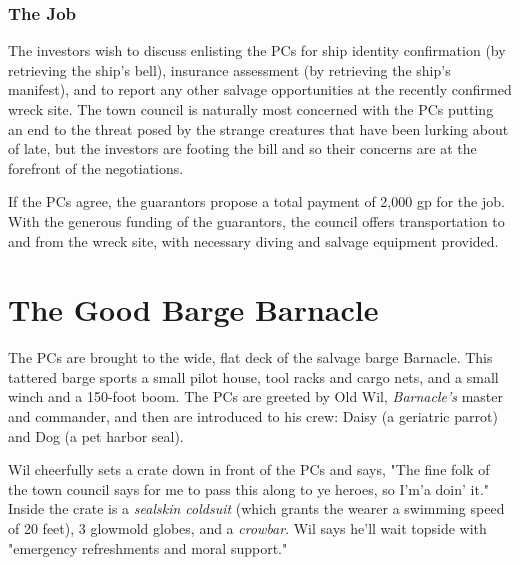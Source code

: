 \documentclass[10pt,a4paper,twoside,bg=print,twocolumn,openany,nodeprecatedcode]{dndbook}
\begin{document}
\subsubsection{The Job}
The investors wish to discuss enlisting the PCs for ship identity confirmation (by retrieving the ship's bell), insurance assessment (by retrieving the ship's manifest), and to report any other salvage opportunities at the recently confirmed wreck site. The town council is naturally most concerned with the PCs putting an end to the threat posed by the strange creatures that have been lurking about of late, but the investors are footing the bill and so their concerns are at the forefront of the negotiations.

If the PCs agree, the guarantors propose a total payment of 2,000 gp for the job. With the generous funding of the guarantors, the council offers transportation to and from the wreck site, with necessary diving and salvage equipment provided.

\section{The Good Barge Barnacle}
The PCs are brought to the wide, flat deck of the salvage barge Barnacle. This tattered barge sports a small pilot house, tool racks and cargo nets, and a small winch and a 150-foot boom. The PCs are greeted by Old Wil, \textit{Barnacle's} master and commander, and then are introduced to his crew: Daisy (a geriatric parrot) and Dog (a pet harbor seal).

Wil cheerfully sets a crate down in front of the PCs and says, "The fine folk of the town council says for me to pass this along to ye heroes, so I'm'a doin' it." Inside the crate is a \textit{sealskin coldsuit} (which grants the wearer a swimming speed of 20 feet), 3 glowmold globes, and a \textit{crowbar}. Wil says he'll wait topside with "emergency refreshments and moral support."
\end{document}
